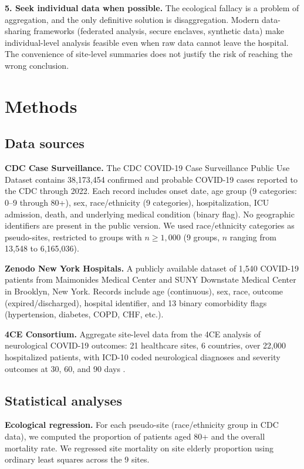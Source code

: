 \documentclass{article}
\begin{document}
\textbf{5. Seek individual data when possible.}  The ecological fallacy is
a problem of aggregation, and the only definitive solution is disaggregation.
Modern data-sharing frameworks (federated analysis, secure enclaves, synthetic
data) make individual-level analysis feasible even when raw data cannot leave
the hospital.  The convenience of site-level summaries does not justify the
risk of reaching the wrong conclusion.


\section{Methods}

\subsection{Data sources}

\textbf{CDC Case Surveillance.}  The CDC COVID-19 Case Surveillance Public
Use Dataset contains 38,173,454 confirmed and probable COVID-19 cases reported
to the CDC through 2022.  Each record includes onset date, age group (9
categories: 0--9 through 80+), sex, race/ethnicity (9 categories),
hospitalization, ICU admission, death, and underlying medical condition (binary
flag).  No geographic identifiers are present in the public version.  We used
race/ethnicity categories as pseudo-sites, restricted to groups with $n \geq
1{,}000$ (9 groups, $n$ ranging from 13,548 to 6,165,036).

\textbf{Zenodo New York Hospitals.}  A publicly available dataset of 1,540
COVID-19 patients from Maimonides Medical Center and SUNY Downstate Medical
Center in Brooklyn, New York.  Records include age (continuous), sex,
race, outcome (expired/discharged), hospital identifier, and 13 binary
comorbidity flags (hypertension, diabetes, COPD, CHF, etc.).

\textbf{4CE Consortium.}  Aggregate site-level data from the 4CE analysis
of neurological COVID-19 outcomes: 21 healthcare sites, 6 countries, over
22,000 hospitalized patients, with ICD-10 coded neurological diagnoses and
severity outcomes at 30, 60, and 90 days \cite{four_ce_neuro2021}.

\subsection{Statistical analyses}

\textbf{Ecological regression.}  For each pseudo-site (race/ethnicity group
in CDC data), we computed the proportion of patients aged 80+ and the overall
mortality rate.  We regressed site mortality on site elderly proportion using
ordinary least squares across the 9 sites.
\end{document}
